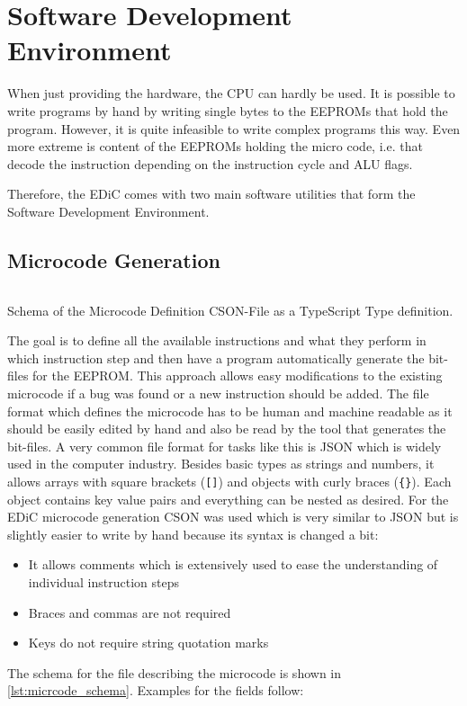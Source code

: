 \chapter{Software Development Environment}\label{cha:software}
When just providing the hardware, the \gls{CPU} can hardly be used.
It is possible to write programs by hand by writing single bytes to the \glspl{EEPROM} that hold the program.
However, it is quite infeasible to write complex programs this way.
Even more extreme is content of the \glspl{EEPROM} holding the micro code, i.e. that decode the instruction depending on the instruction cycle and \gls{ALU} flags.

Therefore, the \gls{EDiC} comes with two main software utilities that form the Software Development Environment.

\section{Microcode Generation}\label{sec:microcode}
\begin{listing}[t]
  \inputminted[linenos,
    breaklines,
    frame=leftline,
    xleftmargin=20pt,
  ]{TypeScript}{src/microcode.ts}
  \caption{Schema of the Microcode Definition CSON-File \cite{CSON} as a TypeScript \cite{TS} Type definition.}
  \label{lst:micrcode_schema}
\end{listing}
The goal is to define all the available instructions and what they perform in which instruction step and then have a program automatically generate the bit-files for the \gls{EEPROM}.
This approach allows easy modifications to the existing microcode if a bug was found or a new instruction should be added.
The file format which defines the microcode has to be human and machine readable as it should be easily edited by hand and also be read by the tool that generates the bit-files.
A very common file format for tasks like this is \gls{JSON} \cite{JSON} which is widely used in the computer industry.
Besides basic types as strings and numbers, it allows arrays with square brackets (\texttt{[]}) and objects with curly braces (\texttt{\{\}}).
Each object contains key value pairs and everything can be nested as desired.
For the \gls{EDiC} microcode generation \gls{CSON} was used which is very similar to \gls{JSON} but is slightly easier to write by hand because its syntax is changed a bit:
\begin{itemize}
  \item It allows comments which is extensively used to ease the understanding of individual instruction steps
  \item Braces and commas are not required
  \item Keys do not require string quotation marks
\end{itemize}
The schema for the file describing the microcode is shown in \cref{lst:micrcode_schema}.
Examples for the fields follow:
